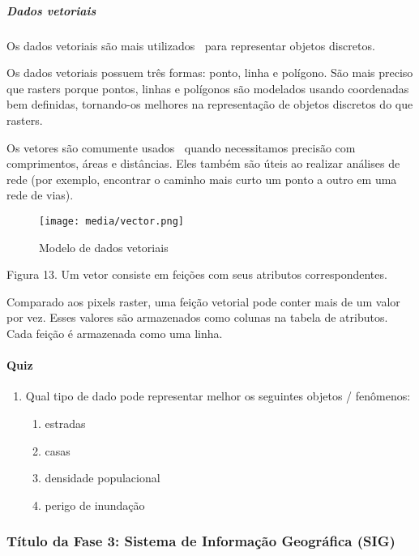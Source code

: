 \documentclass[
]{book}
\providecommand{\tightlist}{%
  \setlength{\itemsep}{0pt}\setlength{\parskip}{0pt}}
\theoremstyle{definition}
\theoremstyle{definition}
\theoremstyle{definition}
\theoremstyle{definition}
\theoremstyle{remark}
\begin{document}
\hypertarget{dados-vetoriais}{%
\subparagraph{Dados vetoriais}\label{dados-vetoriais}}

Os dados vetoriais são mais utilizados para representar objetos discretos.

Os dados vetoriais possuem três formas: ponto, linha e polígono. São mais preciso que rasters porque pontos, linhas e polígonos são modelados usando coordenadas bem definidas, tornando-os melhores na representação de objetos discretos do que rasters.

Os vetores são comumente usados quando necessitamos precisão com comprimentos, áreas e distâncias. Eles também são úteis ao realizar análises de rede (por exemplo, encontrar o caminho mais curto um ponto a outro em uma rede de vias).

\begin{figure}
\centering
\texttt{[image: media/vector.png]}
\caption{Modelo de dados vetoriais}
\end{figure}

Figura 13. Um vetor consiste em feições com seus atributos correspondentes.

Comparado aos pixels raster, uma feição vetorial pode conter mais de um valor por vez. Esses valores são armazenados como colunas na tabela de atributos. Cada feição é armazenada como uma linha.

\hypertarget{quiz-1}{%
\paragraph{Quiz}\label{quiz-1}}

\begin{enumerate}
\def\labelenumi{\arabic{enumi}.}
\tightlist
\item
  Qual tipo de dado pode representar melhor os seguintes objetos / fenômenos:

  \begin{enumerate}
  \def\labelenumii{\arabic{enumii}.}
  \tightlist
  \item
    estradas
  \item
    casas
  \item
    densidade populacional
  \item
    perigo de inundação
  \end{enumerate}
\end{enumerate}

\hypertarget{tuxedtulo-da-fase-3-sistema-de-informauxe7uxe3o-geogruxe1fica-sig}{%
\subsubsection{Título da Fase 3: Sistema de Informação Geográfica (SIG)}\label{tuxedtulo-da-fase-3-sistema-de-informauxe7uxe3o-geogruxe1fica-sig}}
\end{document}
